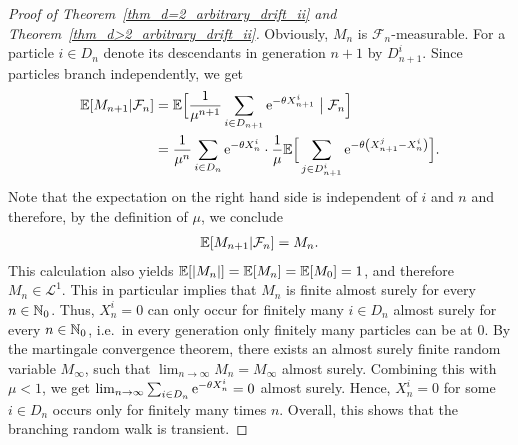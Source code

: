 \begin{proof}[Proof of Theorem~\ref{thm_d=2_arbitrary_drift_ii} and Theorem~\ref{thm_d>2_arbitrary_drift_ii}]
Obviously, $M_n$ is $\mathcal{F}_n$-measurable. For a particle $i \in D_n$ denote its descendants in generation $n+1$ by $D_{n+1}^i$. Since particles branch independently, we get
\begin{align*}
\mathbb{E}[ M_{n+1} | \mathcal{F}_n ] &= \mathbb{E} \Bigl[\frac{1}{\mu^{n+1}} \sum_{i \in D_{n+1}} \mathrm{e}^{-\theta X_{n+1}^i} \bigm\vert \mathcal{F}_n \Bigr] \\
                              &= \frac{1}{\mu^n} \sum_{i \in D_{n}} \mathrm{e}^{-\theta X_{n}^i} \cdot \frac{1}{\mu} \mathbb{E} \Bigr[ \sum_{j \in D_{n+1}^i} \mathrm{e}^{-\theta \left( X_{n+1}^j - X_{n}^i \right)} \Bigl].
\end{align*}
Note that the expectation on the right hand side is independent of $i$ and $n$ and therefore, by the definition of $\mu$, we conclude
\begin{align*}
\mathbb{E}[ M_{n+1} | \mathcal{F}_n ] = M_n.
\end{align*}
This calculation also yields $\mathbb{E}[\lvert M_n\rvert]= \mathbb{E}[M_n]=\mathbb{E}[M_0]=1$, and therefore $M_n \in \mathcal{L}^1$. This in particular implies that $M_n$ is finite almost surely for every $n \in \mathbb{N}_0$. Thus, $X_n^i=0$ can only occur for finitely many $i \in D_n$ almost surely for every $n \in \mathbb{N}_0$, i.e.~in every generation only finitely many particles can be at $0$.
By the martingale convergence theorem, there exists an almost surely finite random variable $M_\infty$, such that $\lim_{n \to \infty} M_n = M_\infty$ almost surely.
Combining this with $\mu <1$, we get $\lim_{n \to \infty}\sum_{i \in D_{n}} \mathrm{e}^{-\theta X_{n}^i} = 0$ almost surely. Hence, $X_n^i=0$ for some $i \in D_n$ occurs only for finitely many times $n$. Overall, this shows that the branching random walk is transient.


\end{proof}
